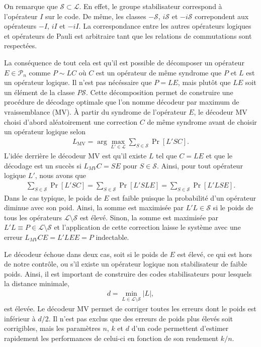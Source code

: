 On remarque que $\mathcal S \subset \mathcal L$.
En effet, le groupe stabilisateur correspond à l'opérateur $I$ sur le code.
De même, les classes $-\mathcal S$, $i\mathcal S$ et $-i\mathcal S$ correpondent
aux opérateurs $-I$, $iI$ et $-iI$.
La correspondance entre les autres opérateurs logiques et opérateurs de Pauli est
arbitraire tant que les relations de commutations sont respectées.

La conséquence de tout cela est qu'il est possible de décomposer un opérateur
$E \in \mathcal P_n$ comme $P \sim LC$ où $C$ est un opérateur de même syndrome que $P$
et $L$ est un opérateur logique.
Il n'est pas nécéssaire que $P = LE$, mais plutôt que $LE$ soit un élément de la classe
$P\mathcal S$.
Cette décomposition permet de construire une procédure de décodage optimale que l'on 
nomme décodeur par maximum de vraissemblance (MV).
À partir du syndrome de l'opérateur $E$, 
le décodeur MV choisi d'abord aléatoirement une correction $C$ de même syndrome avant
de choisir un opérateur logique selon
\begin{align}
  L_{\text{MV}} = \arg\max_{L' \in \mathcal L} \sum_{S \in \mathcal S} \Pr[L'SC].
\end{align}
L'idée derrière le décodeur MV est qu'il existe $L$ tel que $C = LE$
et que le décodage est un succès si $L_{MV}C = SE$ pour $S \in \mathcal S$.
Ainsi, pour tout opérateur logique $L'$, nous avons que 
\begin{align}
  \sum_{S\in \mathcal S} \Pr[L'SC]
  =
  \sum_{S\in \mathcal S} \Pr[L'SLE]
  =
  \sum_{S\in \mathcal S} \Pr[L'LSE].
\end{align}
Dans le cas typique,
le poids de $E$ est faible puisque la probabilité d'un opérateur diminue avec son poid.
Ainsi, la somme est maximisée par $L'L \in \mathcal S$ si le poids de tous les opérateurs
$\mathcal L \setminus \mathcal S$ est élevé.
Sinon,
la somme est maximisée par $L'L \equiv P \in \mathcal L \setminus \mathcal S$ et l'application de cette correction
laisse le système avec une erreur $L_{MV}CE = L'LEE = P$ indectable.

Le décodeur échoue dans deux cas,
soit si le poids de $E$ est élevé, ce qui est hors de notre contrôle,
ou s'il existe un opérateur logique non stabilisateur de faible poids.
Ainsi,
il est important de construire des codes stabilisateurs pour lesquels la distance minimale,
\begin{align}
  d = \min_{L \in \mathcal L \setminus \mathcal S} |L|,
\end{align}
est élevée.
Le décodeur MV permet de corriger toutes les erreurs dont le poids est inférieur à $d / 2$.
Il n'est pas exclus que des erreurs de poids plus élevés soit corrigibles, 
mais les paramètres $n$, $k$ et $d$ d'un code permettent d'estimer rapidement les performances
de celui-ci en fonction de son rendement $k/n$.

